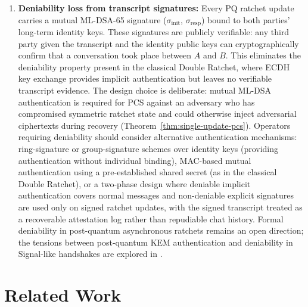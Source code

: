 \documentclass[11pt,a4paper]{article}
\theoremstyle{remark}
\theoremstyle{plain}
\newcommand{\HMAC}{\mathsf{HMAC}}
\newcommand{\strlit}[1]{\text{\upshape\texttt{"#1"}}}
\begin{document}
\begin{enumerate}
        verifies Bob's authenticated response $tag_B = \HMAC_{\mathrm{SHA3\text{-}256}}(K_{conf},
        \strlit{Bob} \| M_0^{core})$.  Until that response is received, Alice must treat the
        session as pending one-sided confirmation only and must not send application data that
        requires mutual confirmation guarantees.  A missing or unverifiable $tag_B$ is an
        authentication/availability failure, not implicit permission to proceed.
  \item \textbf{Deniability loss from transcript signatures:}
        Every PQ ratchet update carries a mutual ML-DSA-65 signature ($\sigma_{\mathrm{init}}$,
        $\sigma_{\mathrm{resp}}$) bound to both parties' long-term identity keys.  These signatures
        are publicly verifiable: any third party given the transcript and the identity public keys
        can cryptographically confirm that a conversation took place between $A$ and $B$.  This
        eliminates the deniability property present in the classical Double Ratchet, where ECDH
        key exchange provides implicit authentication but leaves no verifiable transcript evidence.
        The design choice is deliberate: mutual ML-DSA authentication is required for PCS against
        an adversary who has compromised symmetric ratchet state and could otherwise inject
        adversarial ciphertexts during recovery (Theorem~\ref{thm:single-update-pcs}).  Operators
        requiring deniability should consider alternative authentication mechanisms: ring-signature
        or group-signature schemes over identity keys (providing authentication without individual
        binding), MAC-based mutual authentication using a pre-established shared secret (as in the
        classical Double Ratchet), or a two-phase design where deniable implicit authentication
        covers normal messages and non-deniable explicit signatures are used only on signed ratchet
        updates, with the signed transcript treated as a recoverable attestation log rather than
        repudiable chat history.  Formal deniability in post-quantum asynchronous ratchets remains an open
        direction; the tensions between post-quantum KEM authentication and deniability in Signal-like handshakes are explored in \cite{brendel2020pqx3dh}.
\end{enumerate}

\section{Related Work}
\label{sec:related}
\end{document}
